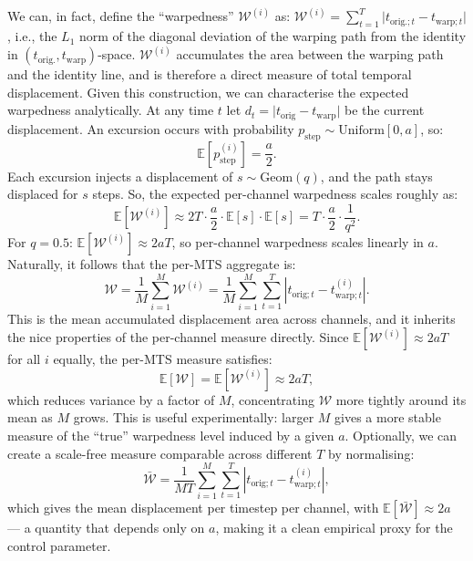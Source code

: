\documentclass{article}
\theoremstyle{plain}
\theoremstyle{definition}
\theoremstyle{remark}
\begin{document}
We can, in fact, define the “warpedness” $\mathcal{W}^{(i)}$ as: $\mathcal{W}^{(i)} = \sum_{t=1}^{T}\lvert t_{\mathrm{orig.};t}-t_{\mathrm{warp};t}\rvert$, i.e., the $L_1$ norm of the diagonal deviation of the warping path from the identity in $(t_{\mathrm{orig.}},t_{\mathrm{warp}})$-space. $\mathcal{W}^{(i)}$ accumulates the area between the warping path and the identity line, and is therefore a direct measure of total temporal displacement. Given this construction, we can characterise the expected warpedness analytically. At any time $t$ let $d_t = \lvert t_{\mathrm{orig}} - t_{\mathrm{warp}}\rvert$ be the current displacement. An excursion occurs with probability $p_{\mathrm{step}} \sim \mathrm{Uniform}[0,a]$, so:
\begin{equation*}
\mathbb{E}[p_{\mathrm{step}}^{(i)}] = \frac{a}{2}.
\end{equation*}
Each excursion injects a displacement of $s \sim \mathrm{Geom}(q)$, and the path stays displaced for $s$ steps. So, the expected per-channel warpedness scales roughly as:
\begin{equation*}
\mathbb{E}[\mathcal{W}^{(i)}] \approx 2T \cdot \frac{a}{2} \cdot \mathbb{E}[s] \cdot \mathbb{E}[s] = T \cdot \frac{a}{2} \cdot \frac{1}{q^2}.
\end{equation*}
For $q=0.5$: $\mathbb{E}[\mathcal{W}^{(i)}] \approx 2aT$, so per-channel warpedness scales linearly in $a$. Naturally, it follows that the per-MTS aggregate is:
\begin{equation*}
\mathcal{W} = \frac{1}{M}\sum_{i=1}^{M}\mathcal{W}^{(i)} = \frac{1}{M}\sum_{i=1}^{M} \sum_{t=1}^{T}\left| t_{\mathrm{orig};t} - t_{\mathrm{warp};t}^{(i)}\right|.
\end{equation*}
This is the mean accumulated displacement area across channels, and it inherits the nice properties of the per-channel measure directly. Since $\mathbb{E}[\mathcal{W}^{(i)}] \approx 2aT$ for all $i$ equally, the per-MTS measure satisfies:
\begin{equation*}
\mathbb{E}[\mathcal{W}] = \mathbb{E}[\mathcal{W}^{(i)}] \approx 2aT,
\end{equation*}
which reduces variance by a factor of $M$, concentrating $\mathcal{W}$ more tightly around its mean as $M$ grows. This is useful experimentally: larger $M$ gives a more stable measure of the “true” warpedness level induced by a given $a$. Optionally, we can create a scale-free measure comparable across different $T$ by normalising:
\begin{equation*}
\bar{\mathcal{W}} = \frac{1}{MT} \sum_{i=1}^{M} \sum_{t=1}^{T}\left| t_{\mathrm{orig};t} - t_{\mathrm{warp};t}^{(i)}\right|,
\end{equation*}
which gives the mean displacement per timestep per channel, with $\mathbb{E}[\bar{\mathcal{W}}] \approx 2a$ — a quantity that depends only on $a$, making it a clean empirical proxy for the control parameter.
\end{document}
